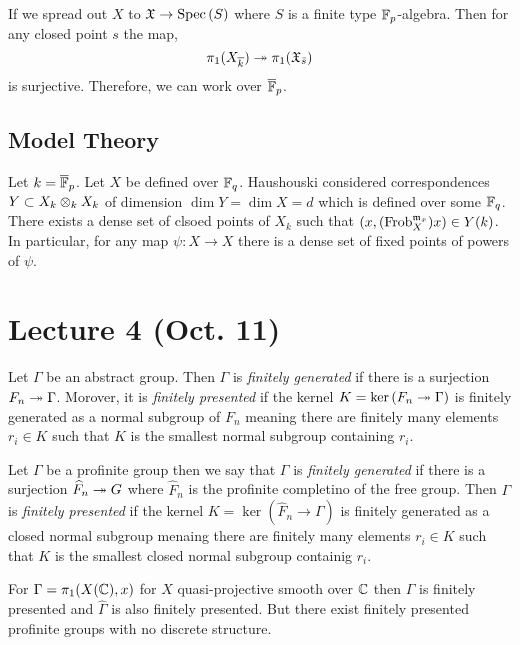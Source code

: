 \documentclass[12pt]{article}
\begin{document}
If we spread out $X$ to $\mathfrak{X} \to \mathrm{Spec}\left( S \right)$ where $S$ is a finite type $\mathbb{F}_p$-algebra. Then for any closed point $s$ the map,
\[ \pi_1(X_{\overline{k}}) \twoheadrightarrow \pi_1(\mathfrak{X}_{\bar{s}}) \]
is surjective. Therefore, we can work over $\overline{\mathbb{F}}_p$.

\subsection{Model Theory}

Let $k = \overline{\mathbb{F}}_p$. Let $X$ be defined over $\mathbb{F}_q$. Haushouski considered correspondences $Y \subset X_{k} \otimes_k X_k$ of dimension $\dim{Y} = \dim{X} = d$ which is defined over some $\mathbb{F}_q$. There exists a dense set of clsoed points of $X_{k}$ such that $(x, (\mathrm{Frob}_X^{\mathfrak{m}_x}) x) \in Y(k)$. 
\bigskip\\
In particular, for any map $\psi : X \to X$ there is a dense set of fixed points of powers of $\psi$. 

\section{Lecture 4 (Oct. 11)}

\begin{defn}
Let $\Gamma$ be an abstract group. Then $\Gamma$ is \textit{finitely generated} if there is a surjection $F_n \twoheadrightarrow \Gamma$. Morover, it is \textit{finitely presented} if the kernel $K = \ker{(F_n \twoheadrightarrow\Gamma)}$ is finitely generated as a normal subgroup of $F_n$ meaning there are finitely many elements $r_i \in K$ such that $K$ is the smallest normal subgroup containing $r_i$.  
\end{defn}

\begin{defn}
Let $\Gamma$ be a profinite group then we say that $\Gamma$ is \textit{finitely generated} if there is a surjection $\widehat{F}_n \twoheadrightarrow G$ where $\widehat{F}_n$ is the profinite completino of the free group. Then $\Gamma$ is \textit{finitely presented} if the kernel $K = \ker{(\widehat{F}_n \to \Gamma)}$ is finitely generated as a closed normal subgroup menaing there are finitely many elements $r_i \in K$ such that $K$ is the smallest closed normal subgroup containig $r_i$. 
\end{defn}

\begin{example}
For $\Gamma = \pi_1(X(\mathbb{C}), x)$ for $X$ quasi-projective smooth over $\mathbb{C}$ then $\Gamma$ is finitely presented and $\widehat{\Gamma}$ is also finitely presented. But there exist finitely presented profinite groups with no discrete structure.
\end{example}
\end{document}

